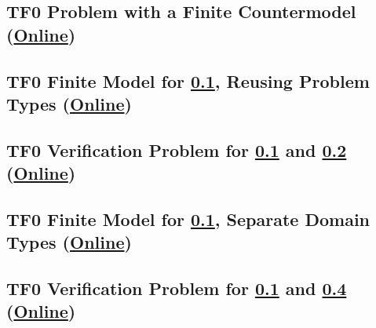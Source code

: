 \documentclass{easychair}
\begin{document}
\subsection{TF0 Problem with a Finite Countermodel
(\href{https://raw.githubusercontent.com/GeoffsPapers/InterpretationFormat/master/Examples/TFF_Finite.p}{Online})}
\label{TFF_Finite.p}
\begin{small}

\end{small}

\newpage
\subsection{TF0 Finite Model for \ref{TFF_Finite.p}, Reusing Problem Types
(\href{https://raw.githubusercontent.com/GeoffsPapers/InterpretationFormat/master/Examples/TFF_Finite.s}{Online})}
\label{TFF_Finite.s}
\begin{small}

\end{small}

\newpage
\subsection{TF0 Verification Problem for \ref{TFF_Finite.p} and \ref{TFF_Finite.s}
(\href{https://raw.githubusercontent.com/GeoffsPapers/InterpretationFormat/master/Examples/TFF_Finite.s.p}{Online})}
\label{TFF_Finite.s.p}
\begin{small}

\end{small}

\newpage
\subsection{TF0 Finite Model for \ref{TFF_Finite.p}, Separate Domain Types
(\href{https://raw.githubusercontent.com/GeoffsPapers/InterpretationFormat/master/Examples/TFF_Finite_SeparateDomains.s}{Online})}
\label{TFF_Finite_SeparateDomains.s}
\begin{small}

\end{small}

\newpage
\subsection{TF0 Verification Problem for \ref{TFF_Finite.p} and \ref{TFF_Finite_SeparateDomains.s}
(\href{https://raw.githubusercontent.com/GeoffsPapers/InterpretationFormat/master/Examples/TFF_Finite_SeparateDomains.s.p}{Online})}
\label{TFF_Finite_SeparateDomains.s.p}
\begin{small}

\end{small}
\end{document}

